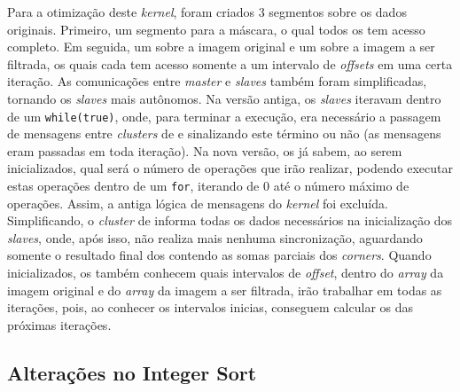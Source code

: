 \documentclass[a4paper,11pt]{article}
\begin{document}
Para a otimização deste \textit{kernel}, foram criados 3 segmentos sobre os dados originais. Primeiro, um segmento para a máscara, o qual todos os \ccs tem acesso completo. Em seguida, um sobre a imagem original e um sobre a imagem a ser filtrada, os quais cada \cc tem acesso somente a um intervalo de \textit{offsets} em uma certa iteração. As comunicações entre \textit{master} e \textit{slaves} também foram simplificadas, tornando os \textit{slaves} mais autônomos. Na versão antiga, os \textit{slaves} iteravam dentro de um \texttt{while(true)}, onde, para terminar a execução, era necessário a passagem de mensagens entre \textit{clusters} de \io e \ccs sinalizando este término ou não (as mensagens eram passadas em toda iteração). Na nova versão, os \ccs já sabem, ao serem inicializados, qual será o número de operações que irão realizar, podendo executar estas operações dentro de um \texttt{for}, iterando de 0 até o número máximo de operações. Assim, a antiga lógica de mensagens do \textit{kernel} foi excluída. Simplificando, o \textit{cluster} de \io informa todas os dados necessários na inicialização dos \textit{slaves}, onde, após isso, não realiza mais nenhuma sincronização, aguardando somente o resultado final dos \ccs contendo as somas parciais dos \textit{corners}.  Quando inicializados, os \ccs também conhecem quais intervalos de \textit{offset}, dentro do \textit{array} da imagem original e do \textit{array} da imagem a ser filtrada, irão trabalhar em todas as iterações, pois, ao conhecer os intervalos inicias, conseguem calcular os das próximas iterações.

\subsection{Alterações no Integer Sort}
\end{document}
